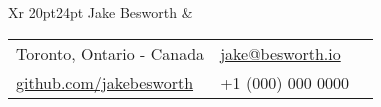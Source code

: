 \documentclass[9pt]{extarticle}
\makeatletter
\newcommand\HUGE{\@setfontsize\Huge{20pt}{24pt}}
\makeatother
\begin{document}
{
    \begin{tabularx}{\textwidth}{Xr}
    {\HUGE\leavevmode\color{em-light} Jake Besworth} &
        \null\hfill\small\begin{tabular}{llX}
            \faMapMarker\space\space\space\color{darkgrey} Toronto, Ontario - Canada & \faEnvelope\space\space\color{darkgrey} \href{mailto:jake@besworth.io}{jake@besworth.io} \\[3px]
            \faGithub\space\space\color{darkgrey} \href{https://github.com/jakebesworth}{github.com/jakebesworth} & {\large\faMobilePhone}\space\space\space\color{darkgrey} +1 (000) 000 0000 \\[10px]
        \end{tabular}
    \end{tabularx}

    {\color{lightgrey}{\centerline{\rule{17cm}{0.4pt}}}}
}
\end{document}
